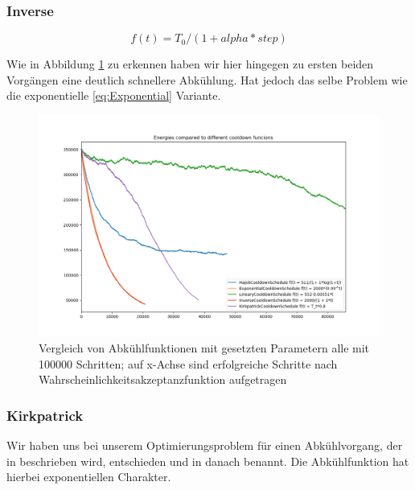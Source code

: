 \subsubsection{Inverse}

\begin{tcolorbox}[rightrule=3mm, rounded corners=east]
    \begin{equation}\label{eq:Inverse}
        f(t) = T_0 / (1 + alpha * step)
    \end{equation}
\end{tcolorbox}

Wie in Abbildung \ref{pic:Cool Down Comparisson} zu erkennen haben wir hier hingegen zu ersten beiden Vorgängen
eine deutlich schnellere Abkühlung. Hat jedoch das selbe Problem wie die exponentielle \ref{eq:Exponential} Variante.

\begin{figure}[H]
    \centering
    \includegraphics[width=\linewidth]{content/simulatedAnnealing/Bilder/Energy_Cooldown_compared_steps_85771.png}
    \caption{Vergleich von Abkühlfunktionen mit gesetzten Parametern
            alle mit 100000 Schritten; auf x-Achse sind erfolgreiche Schritte nach Wahrscheinlichkeitsakzeptanzfunktion
            aufgetragen}
    \label{pic:Cool Down Comparisson}
\end{figure}


\subsubsection{Kirkpatrick}
Wir haben uns bei unserem Optimierungsproblem für einen Abkühlvorgang, der in \cite{Kirkpatrick671} beschrieben wird, 
entschieden und in danach benannt. Die Abkühlfunktion hat hierbei exponentiellen Charakter. 

